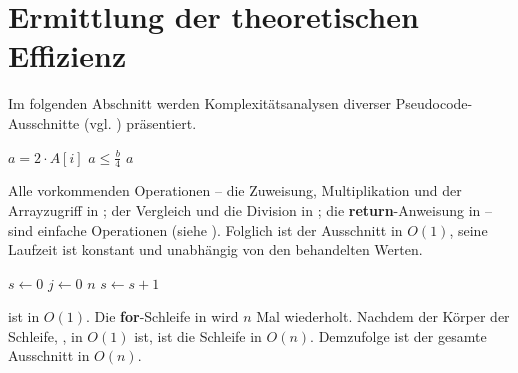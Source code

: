 



\section{Ermittlung der theoretischen Effizienz}
\label{sec:te-ermittlung}

Im folgenden Abschnitt werden Komplexitätsanalysen diverser Pseudocode-Ausschnitte (vgl. \cite[69]{sha2011}) präsentiert.

\begin{codebox}
    \li $a = 2 \cdot A[i]$          \label{ln:ex1-setup}
    \li \If $a \leq \frac{b}{4}$    \label{ln:ex1-if}
    \li     \Then
                \Return $a$         \label{ln:ex1-return}
            \End
\end{codebox}

Alle vorkommenden Operationen -- die Zuweisung, Multiplikation und der Arrayzugriff in ; der Vergleich und die Division in ; die \textbf{return}-Anweisung in  -- sind einfache Operationen (siehe ). Folglich ist der Ausschnitt in $O(1)$, seine Laufzeit ist konstant und unabhängig von den behandelten Werten.

\begin{codebox}
    \li $s \gets 0$                 \label{ln:ex2-outer-assignment}
    \li \For $j \gets 0$ \To $n$    \label{ln:ex2-for}
    \li     \Do
                $s \gets s + 1$     \label{ln:ex2-inner-assignment}
            \End
\end{codebox}

 ist in $O(1)$. Die \textbf{for}-Schleife in  wird $n$ Mal wiederholt. Nachdem der Körper der Schleife, , in $O(1)$ ist, ist die Schleife in $O(n)$. Demzufolge ist der gesamte Ausschnitt in $O(n)$.

